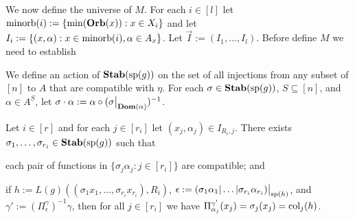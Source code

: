 \documentclass[../main/thesis.tex]{subfiles}
\begin{document}
We now define the universe of $M$. For each $i \in [l]$ let $\text{\upshape minorb}(i) :=
\{\min (\text{\textbf{Orb}}(x)) : x \in X_i\}$ and let $I_{i} := \{(x, \alpha): x \in \text{\upshape minorb}(i), \alpha \in A_x\}$. Let $\vec{I} := (I_1, \ldots, I_{l})$. Before define $M$
we need to establish 

We define an action of $\text{\textbf{Stab}} (\text{sp} (g))$ on the set of all injections from any subset
of $[n]$ to $A$ that are compatible with $\eta$. For each $\sigma \in
\text{\textbf{Stab}} (\text{sp} (g))$, $S \subseteq [n]$, and $\alpha \in A^{\underline{S}}$, let $\sigma
\cdot \alpha := \alpha \circ (\restr{\sigma}{\dom(\alpha)})^{-1}$.

\begin{lem}
  Let $i \in [r]$ and for each $j \in [r_i]$ let $(x_j, \alpha_j) \in I_{R_i,
    j}$. There exists $\sigma_1, \ldots, \sigma_{r_i} \in \text{\textbf{Stab}} (\text{sp} (g))$ such that
  \vspace{-1.5mm}
  \begin{myenum}
  \item\label{lem:defining-h-from-index--obj:1}each pair of functions in
    $\{\sigma_j \alpha_j : j \in [r_i]\}$ are compatible; and
  \item\label{lem:defining-h-from-index--obj:2}if $h := L(g)((\sigma_1 x_1,
    \ldots, \sigma_{r_i} x_{r_i}), R_i)$, $\epsilon := \restr{(\sigma_1 \alpha_1
      \vert \ldots \vert \sigma_{r_i} \alpha_{r_i})}{\consp(h)}$, and $\gamma'
    := (\Pi^{\gamma}_\epsilon)^{-1}\gamma$, then for all $j \in [r_i]$ we have
    $\Pi^{\gamma'}_{\alpha_j}(x_j) = \sigma_j (x_j) = \text{\upshape col}_{j}(h)$.
  \end{myenum}
  \label{lem:defining-h-from-index}
\end{lem}
\end{document}
